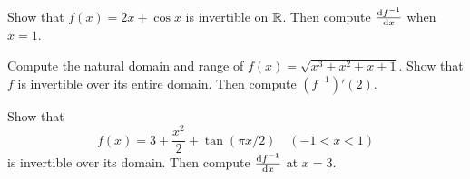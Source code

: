 \begin{example}
Show that $f(x)=2x+\cos x$ is invertible on $\mathbb R$.
Then compute $\frac{\mathrm{d} f^{-1}}{\mathrm{d} x}$ when $x=1$.
\end{example}

\newpage

\begin{example}
Compute the natural domain and range of $f(x)=\sqrt{x^3+x^2+x+1}$.
Show that $f$ is invertible over its entire domain.
Then compute $\left(f^{-1}\right)'(2)$.
\end{example}

\newpage

\begin{example}
Show that 
\begin{equation*}
f(x) = 3+\frac{x^2}{2}+\tan(\pi x/2)\quad (-1<x<1)
\end{equation*}
is invertible over its domain.
Then compute $\frac{\mathrm{d} f^{-1}}{\mathrm{d} x}$ at $x=3$.
\end{example}

%   
